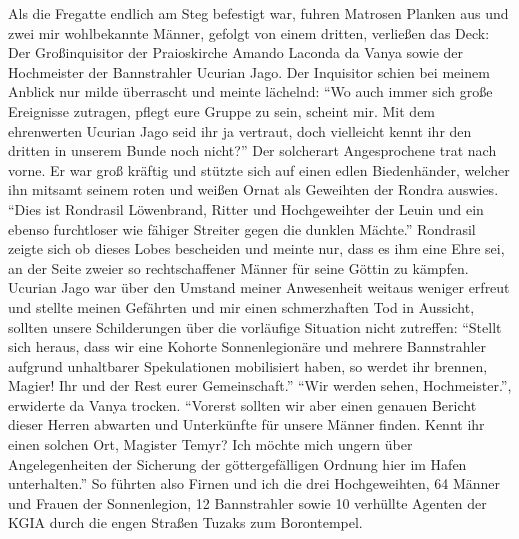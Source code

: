 Als die Fregatte endlich am Steg befestigt war, fuhren Matrosen Planken aus und zwei mir wohlbekannte Männer, gefolgt von einem dritten, verließen das Deck: Der Großinquisitor der Praioskirche Amando Laconda da Vanya sowie der Hochmeister der Bannstrahler Ucurian Jago. Der Inquisitor schien bei meinem Anblick nur milde überrascht und meinte lächelnd: ``Wo auch immer sich große Ereignisse zutragen, pflegt eure Gruppe zu sein, scheint mir. Mit dem ehrenwerten Ucurian Jago seid ihr ja vertraut, doch vielleicht kennt ihr den dritten in unserem Bunde noch nicht?'' Der solcherart Angesprochene trat nach vorne. Er war groß kräftig und stützte sich auf einen edlen Biedenhänder, welcher ihn mitsamt seinem roten und weißen Ornat als Geweihten der Rondra auswies. ``Dies ist Rondrasil Löwenbrand, Ritter und Hochgeweihter der Leuin und ein ebenso furchtloser wie fähiger Streiter gegen die dunklen Mächte.'' Rondrasil zeigte sich ob dieses Lobes bescheiden und meinte nur, dass es ihm eine Ehre sei, an der Seite zweier so rechtschaffener Männer für seine Göttin zu kämpfen. Ucurian Jago war über den Umstand meiner Anwesenheit weitaus weniger erfreut und stellte meinen Gefährten und mir einen schmerzhaften Tod in Aussicht, sollten unsere Schilderungen über die vorläufige Situation nicht zutreffen: ``Stellt sich heraus, dass wir eine Kohorte Sonnenlegionäre und mehrere Bannstrahler aufgrund unhaltbarer Spekulationen mobilisiert haben, so werdet ihr brennen, Magier! Ihr und der Rest eurer Gemeinschaft.'' ``Wir werden sehen, Hochmeister.'', erwiderte da Vanya trocken. ``Vorerst sollten wir aber einen genauen Bericht dieser Herren abwarten und Unterkünfte für unsere Männer finden. Kennt ihr einen solchen Ort, Magister Temyr? Ich möchte mich ungern über Angelegenheiten der Sicherung der göttergefälligen Ordnung hier im Hafen unterhalten.'' So führten also Firnen und ich die drei Hochgeweihten, 64 Männer und Frauen der Sonnenlegion, 12 Bannstrahler sowie 10 verhüllte Agenten der KGIA durch die engen Straßen Tuzaks zum Borontempel.


